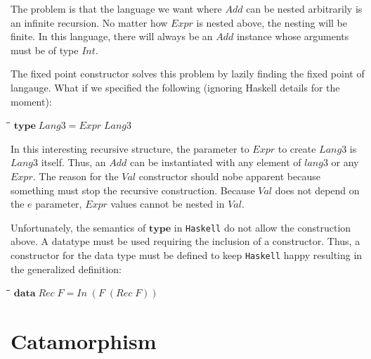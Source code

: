 \documentclass[11pt]{article}
\newlength{\lwidth}\setlength{\lwidth}{4.5cm}
\newlength{\cwidth}\setlength{\cwidth}{8mm} %
\newcommand{\Conid}[1]{\mathit{#1}}
\newcommand{\Varid}[1]{\mathit{#1}}
\begin{document}
The problem is that the language we want where \ensuremath{\Conid{Add}} can be nested
arbitrarily is an infinite recursion.  No matter how \ensuremath{\Conid{Expr}} is nested
above, the nesting will be finite.  In this language, there will
always be an \ensuremath{\Conid{Add}} instance whose arguments must be of type \ensuremath{\Conid{Int}}.

The fixed point constructor solves this problem by lazily finding the
fixed point of langauge.  What if we specified the following (ignoring
Haskell details for the moment):

\begin{tabbing}
\qquad\=\hspace{\lwidth}\=\hspace{\cwidth}\=\+\kill
${\mathbf{type}\;\Conid{Lang3}\mathrel{=}\Conid{Expr}\;\Conid{Lang3}}$
\end{tabbing}
In this interesting recursive structure, the parameter to \ensuremath{\Conid{Expr}} to
create \ensuremath{\Conid{Lang3}} is \ensuremath{\Conid{Lang3}} itself.  Thus, an \ensuremath{\Conid{Add}} can be instantiated
with any element of \ensuremath{\Varid{lang3}} or any \ensuremath{\Conid{Expr}}.  The reason for the \ensuremath{\Conid{Val}}
constructor should nobe apparent because something must stop the
recursive construction.  Because \ensuremath{\Conid{Val}} does not depend on the \ensuremath{\Varid{e}}
parameter, \ensuremath{\Conid{Expr}} values cannot be nested in \ensuremath{\Conid{Val}}.

Unfortunately, the semantics of \ensuremath{\mathbf{type}} in \texttt{Haskell} do not
allow the construction above.  A datatype must be used requiring the
inclusion of a constructor.  Thus, a constructor for the data type
must be defined to keep \texttt{Haskell} happy resulting in the
generalized definition:

\begin{tabbing}
\qquad\=\hspace{\lwidth}\=\hspace{\cwidth}\=\+\kill
${\mathbf{data}\;\Conid{Rec}\;\Conid{F}\mathrel{=}\Conid{In}\;(\Conid{F}\;(\Conid{Rec}\;\Conid{F}))}$
\end{tabbing}
\section{Catamorphism}
\end{document}

